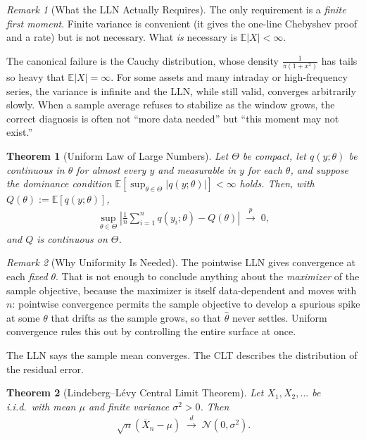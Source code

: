 \documentclass[11pt]{article}
\theoremstyle{definition}
\theoremstyle{plain}
\newtheorem{theorem}{Theorem}[section]
\theoremstyle{remark}
\newtheorem{remark}{Remark}[section]
\begin{document}
\begin{remark}[What the LLN Actually Requires]
    The only requirement is a \emph{finite first moment}. Finite variance is convenient (it gives the one-line Chebyshev proof and a rate) but is not necessary. What \emph{is} necessary is $\mathbb{E}|X| < \infty$.

    The canonical failure is the Cauchy distribution, whose density $\frac{1}{\pi(1+x^2)}$ has tails so heavy that $\mathbb{E}|X| = \infty$. For some assets and many intraday or high-frequency series, the variance is infinite and the LLN, while still valid, converges arbitrarily slowly. When a sample average refuses to stabilize as the window grows, the correct diagnosis is often not ``more data needed'' but ``this moment may not exist.''
\end{remark}

\begin{theorem}[Uniform Law of Large Numbers]
    Let $\Theta$ be compact, let $q(y;\theta)$ be continuous in $\theta$ for almost every $y$ and measurable in $y$ for each $\theta$, and suppose the dominance condition $\mathbb{E}[\sup_{\theta\in\Theta}|q(y;\theta)|] < \infty$ holds. Then, with $Q(\theta) := \mathbb{E}[q(y;\theta)]$,
    \begin{align}
        \sup_{\theta \in \Theta}\left|\frac{1}{n}\sum_{i=1}^n q(y_i;\theta) - Q(\theta)\right| \;\xrightarrow{p}\; 0,
    \end{align}
    and $Q$ is continuous on $\Theta$.
\end{theorem}

\begin{remark}[Why Uniformity Is Needed]
    The pointwise LLN gives convergence at each \emph{fixed} $\theta$. That is not enough to conclude anything about the \emph{maximizer} of the sample objective, because the maximizer is itself data-dependent and moves with $n$: pointwise convergence permits the sample objective to develop a spurious spike at some $\theta$ that drifts as the sample grows, so that $\hat{\theta}$ never settles. Uniform convergence rules this out by controlling the entire surface at once.
\end{remark}

The LLN says the sample mean converges. The CLT describes the distribution of the residual error.

\begin{theorem}[Lindeberg--L\'evy Central Limit Theorem]
    Let $X_1,X_2,\dots$ be i.i.d.\ with mean $\mu$ and \emph{finite} variance $\sigma^2 > 0$. Then
    \begin{align}
        \sqrt{n}\left(\bar{X}_n - \mu\right) \;\xrightarrow{d}\; \mathcal{N}(0,\sigma^2).
    \end{align}
\end{theorem}
\end{document}
